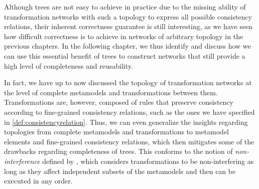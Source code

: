 Although trees are not easy to achieve in practice due to the missing ability of transformation networks with such a topology to express all possible consistency relations, their inherent correctness guarantee is still interesting, as we have seen how difficult correctness is to achieve in networks of arbitrary topology in the previous chapters.
In the following chapter, we thus identify and discuss how we can use this essential benefit of trees to construct networks that still provide a high level of completeness and reusability.

In fact, we have up to now discussed the topology of transformation networks at the level of complete metamodels and transformations between them.
Transformations are, however, composed of rules that preserve consistency according to fine-grained consistency relations, such as the ones we have specified in \autoref{def:consistencyrelation}.
Thus, we can even generalize the insights regarding topologies from complete metamodels and transformations to metamodel elements and fine-grained consistency relations, which then mitigates some of the drawbacks regarding completeness of trees.
This conforms to the notion of \emph{non-interference} defined by \textcite{stevens2020BidirectionalTransformationLarge-SoSym}, which considers transformations to be non-interfering as long as they affect independent subsets of the metamodels and then can be executed in any order.

